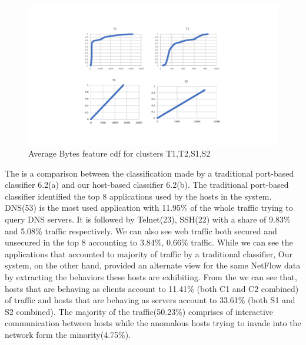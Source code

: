 \begin{figure}[t]
	\centerline{\includegraphics[trim=2cm 2cm 2cm 2cm, scale = 0.7]{bytes_cdf.pdf}}
	\caption{ Average Bytes feature cdf for clusters T1,T2,S1,S2}%
\end{figure}




The  is a comparison between the classification made by a traditional port-based classifier 6.2(a) and our host-based classifier 6.2(b). The traditional port-based classifier identified the top 8 applications used by the hosts in the system. DNS(53) is the most used application with 11.95\% of the whole traffic trying to query DNS servers. It is followed by Telnet(23), SSH(22) with a share of 9.83\% and 5.08\% traffic respectively. We can also see web traffic both secured and unsecured in the top 8 accounting to 3.84\%, 0.66\% traffic. While we can see the applications that accounted to majority of traffic by a traditional classifier, Our system, on the other hand, provided an alternate view for the same NetFlow data by extracting the behaviors these hosts are exhibiting. From the  we can see that, hosts that are behaving as clients account to 11.41\% (both C1 and C2 combined) of traffic and hosts that are behaving as servers account to 33.61\% (both S1 and S2 combined). The majority of the traffic(50.23\%) comprises of interactive communication between hosts while the anomalous hosts trying to invade into the network form the minority(4.75\%). 


